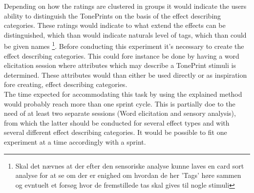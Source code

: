 Depending on how the ratings are clustered in groups it would indicate the users ability to distinguish the TonePrints on the basis of the effect describing categories. These ratings would indicate to what extend the effects can be distinguished, which than would indicate naturals level of tags, which than could be given names \footnote{Skal det nævnes at der efter den sensoriske analyse kunne laves en card sort analyse for at se om der er enighed om hvordan de her 'Tags' høre sammen og evntuelt et forsøg hvor de fremstillede tas skal gives til nogle stimuli}. Before conducting this experiment it's necessary to create the effect describing categories. This could fore instance be done by having a word elicitation session where attributes which may describe a TonePrint stimuli is determined. These attributes would than either be used directly or as inspiration fore creating, effect describing categories.\\

\noindent
The time expected for accommodating this task by using the explained method would probably reach more than one sprint cycle. This is partially doe to the need of at least two separate sessions (Word elicitation and sensory analysis), from which the latter should be conducted for several effect types and with several different effect describing categories. It would be possible to fit one experiment at a time accordingly with a sprint. 

